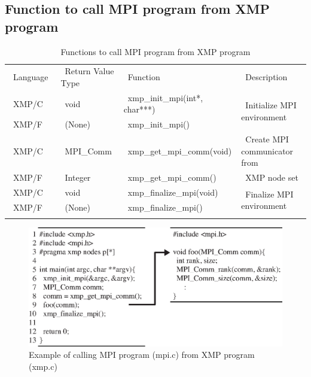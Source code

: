 \documentclass[graybox]{svmult}
\begin{document}
\subsection{Function to call MPI program from XMP program}\label{sec:MPIfromXMP}
\begin{table}[h]
\centering
\caption{Functions to call MPI program from XMP program\cite{pgas-ei}} \label{tab:MPIfromXMP}
\begin{tabular}{l|l|l|l}
\hline\noalign{\smallskip}
~Language~  & ~Return Value Type~ & ~Function~ & ~Description~ \\ 
\noalign{\smallskip}\svhline\noalign{\smallskip}
~XMP/C      & ~void              & ~xmp\_init\_mpi(int*, char***)~ & \multirow{2}{*}{~Initialize MPI environment}\\
~XMP/F       & ~(None)          & ~xmp\_init\_mpi() & \\  
\noalign{\smallskip}\hline\noalign{\smallskip}
~XMP/C      & ~MPI\_Comm & ~xmp\_get\_mpi\_comm(void) & ~Create MPI communicator from \\
~XMP/F       & ~Integer         & ~xmp\_get\_mpi\_comm() &   ~XMP node set \\
\noalign{\smallskip}\hline\noalign{\smallskip}
~XMP/C      & ~void              & ~xmp\_finalize\_mpi(void) & \multirow{2}{*}{~Finalize MPI environment}\\
~XMP/F       & ~(None)          & ~xmp\_finalize\_mpi() & \\ 
\noalign{\smallskip}\hline\noalign{\smallskip}
\end{tabular}
\end{table}

\begin{figure}[h]
\sidecaption
\includegraphics[scale=.82]{img/program1.eps}
\caption{Example of calling MPI program (mpi.c) from XMP program (xmp.c)\cite{pgas-ei}} \label{fig:program1}
\end{figure}
\end{document}
